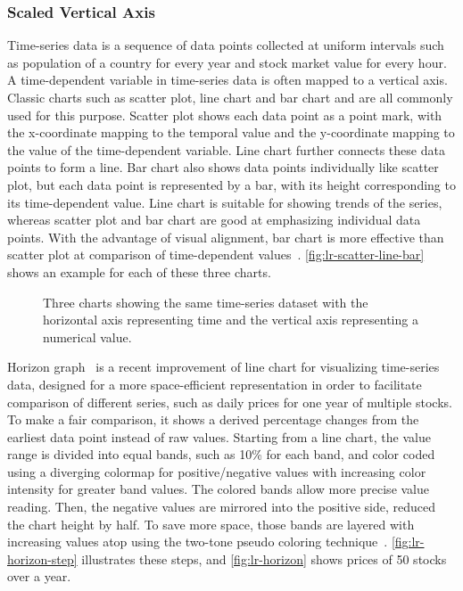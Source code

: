 \subsubsection{Scaled Vertical Axis}
Time-series data is a sequence of data points collected at uniform intervals such as population of a country for every year and stock market value for every hour. A time-dependent variable in time-series data is often mapped to a vertical axis. Classic charts such as scatter plot, line chart and bar chart and are all commonly used for this purpose. Scatter plot shows each data point as a point mark, with the x-coordinate mapping to the temporal value and the y-coordinate mapping to the value of the time-dependent variable. Line chart further connects these data points to form a line. Bar chart also shows data points individually like scatter plot, but each data point is represented by a bar, with its height corresponding to its time-dependent value. Line chart is suitable for showing trends of the series, whereas scatter plot and bar chart are good at emphasizing individual data points. With the advantage of visual alignment, bar chart is more effective than scatter plot at comparison of time-dependent values~\cite{Aigner2011}. \autoref{fig:lr-scatter-line-bar} shows an example for each of these three charts.

\begin{figure}[!htb]
\centering
{}
\hfill
{}
\hfill
{}
\caption{Three charts showing the same time-series dataset with the horizontal axis representing time and the vertical axis representing a numerical value.}
\label{fig:lr-scatter-line-bar}
\end{figure}

Horizon graph~\cite{Reijner2008} is a recent improvement of line chart for visualizing time-series data, designed for a more space-efficient representation in order to facilitate comparison of different series, such as daily prices for one year of multiple stocks. To make a fair comparison, it shows a derived percentage changes from the earliest data point instead of raw values. Starting from a line chart, the value range is divided into equal bands, such as 10\% for each band, and color coded using a diverging colormap for positive/negative values with increasing color intensity for greater band values. The colored bands allow more precise value reading. Then, the negative values are mirrored into the positive side, reduced the chart height by half. To save more space, those bands are layered with increasing values atop using the two-tone pseudo coloring technique~\cite{Saito2005}. \autoref{fig:lr-horizon-step} illustrates these steps, and \autoref{fig:lr-horizon} shows prices of 50 stocks over a year.

